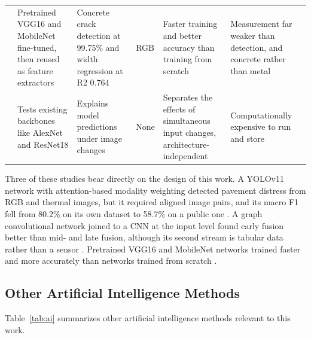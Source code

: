{\begin{xltabular}{\textwidth}{p{0.95cm}>{\RaggedRight\arraybackslash}p{2.6cm}>{\RaggedRight\arraybackslash}p{2.6cm}>{\RaggedRight\arraybackslash}p{2.1cm}>{\RaggedRight\arraybackslash}X>{\RaggedRight\arraybackslash}X}
\citep{Su2024} & Pretrained VGG16 and MobileNet fine-tuned, then reused as feature extractors & Concrete crack detection at 99.75\% and width regression at R2 0.764 & RGB & Faster training and better accuracy than training from scratch & Measurement far weaker than detection, and concrete rather than metal \\
\citep{Kharyuk2026} & Tests existing backbones like AlexNet and ResNet18 & Explains model predictions under image changes & None & Separates the effects of simultaneous input changes, architecture-independent & Computationally expensive to run and store \\
\end{xltabular}
}


Three of these studies bear directly on the design of this work. A YOLOv11
network with attention-based modality weighting detected pavement distress from
RGB and thermal images, but it required aligned image pairs, and its macro F1
fell from 80.2\% on its own dataset to 58.7\% on a public one \citep{Zhang2026b}. A graph
convolutional network joined to a CNN at the input level found early fusion
better than mid- and late fusion, although its second stream is tabular data
rather than a sensor \citep{Chowdhury2026}. Pretrained VGG16 and MobileNet networks trained
faster and more accurately than networks trained from scratch \citep{Su2024}.

\subsection{Other Artificial Intelligence Methods}

Table~\ref{tab:ai} summarizes other artificial intelligence methods relevant to
this work.

